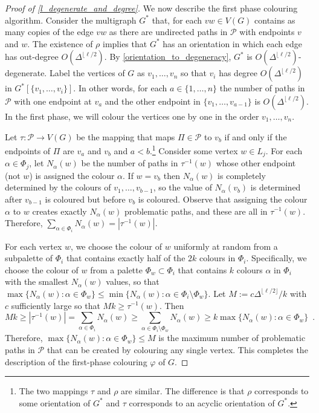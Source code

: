 \documentclass{patmorin}
\begin{document}
\begin{proof}[Proof of \cref{l_degenerate_and_degree}]
  We now describe the first phase colouring algorithm.  Consider the multigraph $G^*$ that, for each $vw\in V(G)$ contains as many copies of the edge $vw$ as there are undirected paths in $\mathcal{P}$ with endpoints $v$ and $w$.  The existence of $\rho$ implies that $G^*$ has an orientation in which each edge has out-degree $O(\Delta^{\lfloor\ell /2})$.  By \cref{orientation_to_degeneracy}, $G^*$ is $O(\Delta^{\lfloor\ell /2})$-degenerate.  Label the vertices of $G$ as $v_1,\ldots,v_n$ so that $v_i$ has degree $O(\Delta^{\lfloor\ell /2})$ in $G^*[\{v_1,\ldots,v_{i}\}]$. In other words, for each $a\in\{1,\ldots,n\}$ the number of paths in $\mathcal{P}$ with one endpoint at $v_a$ and the other endpoint in $\{v_1,\ldots,v_{a-1}\}$ is $O(\Delta^{\lfloor\ell /2})$.  In the first phase, we will colour the vertices one by one in the order $v_1,\ldots,v_n$.

  Let $\tau:\mathcal{P}\to V(G)$ be the mapping that maps $\Pi\in\mathcal{P}$ to $v_b$ if and only if the endpoints of $\Pi$ are $v_a$ and $v_b$ and $a < b$.\footnote{The two mappings $\tau$ and $\rho$ are similar. The difference is that $\rho$ corresponds to some orientation of $G^*$ and $\tau$ corresponds to an acyclic orientation of $G^*$.}  Consider some vertex $w\in L_j$.  For each $\alpha \in \Phi_j$, let $N_{\alpha}(w)$ be the number of paths in $\tau^{-1}(w)$ whose other endpoint (not $w$) is assigned the colour $\alpha$. If $w=v_b$ then $N_{\alpha}(w)$ is completely determined by the colours of $v_1,\ldots,v_{b-1}$, so the value of $N_\alpha(v_b)$ is determined after $v_{b-1}$ is coloured but before $v_b$ is coloured.  Observe that assigning the colour $\alpha$ to $w$ creates exactly $N_{\alpha}(w)$ problematic paths, and these are all in $\tau^{-1}(w)$.  Therefore, $\sum_{\alpha\in\Phi_i} N_\alpha(w)=|\tau^{-1}(w)|$.

  For each vertex $w$, we choose the colour of $w$ uniformly at random from a subpalette of $\Phi_i$ that contains exactly half of the $2k$ colours in $\Phi_i$.  Specifically, we choose the colour of $w$ from a palette $\Phi_w\subset \Phi_i$ that contains $k$ colours $\alpha$ in $\Phi_i$ with the smallest $N_\alpha(w)$ values, so that  $\max\{N_\alpha(w):\alpha\in \Phi_w\}\le\min\{N_\alpha(w):\alpha\in\Phi_i\setminus\Phi_w\}$.  Let $M:=c\Delta^{\lfloor\ell/2\rfloor}/k$ with $c$ sufficiently large so that $Mk\ge \tau^{-1}(w)$.
  Then
  \[
    Mk \ge |\tau^{-1}(w)|= \sum_{\alpha\in \Phi_i} N_\alpha(w) \ge \sum_{\alpha\in\Phi_i\setminus\Phi_w}N_\alpha(w) \ge k\max\{N_\alpha(w):\alpha\in \Phi_w\} \enspace .
  \]
  Therefore, $\max\{N_\alpha(w):\alpha\in \Phi_w\}\le M$ is the maximum number of problematic paths in $\mathcal{P}$ that can be created by colouring any single vertex.  This completes the description of the first-phase colouring $\varphi$ of $G$.



\end{proof}
\end{document}
